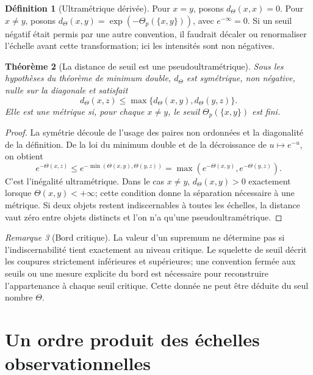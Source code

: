 \documentclass[11pt,oneside]{book}
\newtheorem{theoreme}{Théorème}[chapter]
\theoremstyle{definition}
\newtheorem{definition}[theoreme]{Définition}
\theoremstyle{remark}
\newtheorem{remarque}[theoreme]{Remarque}
\newcommand{\1}{\mathbf 1}
\begin{document}
\begin{definition}[Ultramétrique dérivée]
Pour $x=y$, posons $d_\Theta(x,x)=0$. Pour $x\neq y$, posons $d_\Theta(x,y)=\exp(-\Theta_p(\{x,y\}))$, avec $e^{-\infty}=0$. Si un seuil négatif était permis par une autre convention, il faudrait décaler ou renormaliser l'échelle avant cette transformation; ici les intensités sont non négatives.
\end{definition}

\begin{theoreme}[La distance de seuil est une pseudoultramétrique]
Sous les hypothèses du théorème de minimum double, $d_\Theta$ est symétrique, non négative, nulle sur la diagonale et satisfait
\[
d_\Theta(x,z)\leq\max\{d_\Theta(x,y),d_\Theta(y,z)\}.
\]
Elle est une métrique si, pour chaque $x\neq y$, le seuil $\Theta_p(\{x,y\})$ est fini.
\end{theoreme}
\begin{proof}
La symétrie découle de l'usage des paires non ordonnées et la diagonalité de la définition. De la loi du minimum double et de la décroissance de $u\mapsto e^{-u}$, on obtient
\[
e^{-\Theta(x,z)}\leq e^{-\min(\Theta(x,y),\Theta(y,z))}=\max(e^{-\Theta(x,y)},e^{-\Theta(y,z)}).
\]
C'est l'inégalité ultramétrique. Dans le cas $x\neq y$, $d_\Theta(x,y)>0$ exactement lorsque $\Theta(x,y)<+\infty$; cette condition donne la séparation nécessaire à une métrique. Si deux objets restent indiscernables à toutes les échelles, la distance vaut zéro entre objets distincts et l'on n'a qu'une pseudoultramétrique.
\end{proof}

\begin{remarque}[Bord critique]
La valeur d'un supremum ne détermine pas si l'indiscernabilité tient exactement au niveau critique. Le squelette de seuil décrit les coupures strictement inférieures et supérieures; une convention fermée aux seuils ou une mesure explicite du bord est nécessaire pour reconstruire l'appartenance à chaque seuil critique. Cette donnée ne peut être déduite du seul nombre $\Theta$.
\end{remarque}

\chapter{Un ordre produit des échelles observationnelles}
\end{document}
